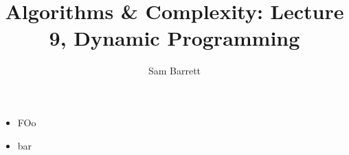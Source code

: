 \documentclass{article}
\title{Algorithms \& Complexity: Lecture 9, Dynamic Programming}
\author{Sam Barrett}
\begin{document}
\begin{itemize}
  \item FOo
        \item bar
\end{itemize}
\end{document}
